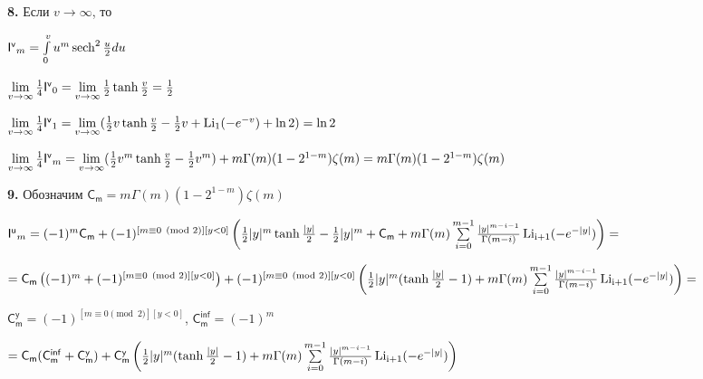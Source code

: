 \documentclass[a4paper,12pt]{article}
\begin{document}
\noindent\textbf{8.} Если $v \longrightarrow \infty$, то

\begin{center}
    $\mathsf{I^{v}}_m = \int\limits_0^{v} u^m \operatorname{sech}^2{u\over{2}} d u$
\end{center}

\begin{center}
    $\lim\limits_{v \rightarrow \infty} {1\over{4}}\mathsf{I^{v}}_0 = \lim\limits_{v \rightarrow \infty} {1\over{2}} \operatorname{tanh}{v\over{2}} = {1\over{2}}$
\end{center}

\begin{center}
    $\lim\limits_{v \rightarrow \infty} {1\over{4}} \mathsf{I^{v}}_1 = \lim\limits_{v \rightarrow \infty} ({1\over{2}} v\operatorname{tanh}{v\over{2}} - {1\over{2}}v + \operatorname{Li_1}(-e^{-v}) + \ln{2}) = \ln{2}$
\end{center}

\begin{center}
    $\lim\limits_{v \rightarrow \infty} {1\over{4}} \mathsf{I^{v}}_m = \lim\limits_{v \rightarrow \infty} ({1\over{2}} v^m \operatorname{tanh}{v\over{2}} - {1\over{2}}v^m) + m \Gamma(m)(1 - 2^{1 - m})\zeta(m) = m \Gamma(m)(1 - 2^{1 - m})\zeta(m)$
\end{center}

\noindent\textbf{9.} Обозначим $\mathsf{C_m} = m \Gamma(m)(1 - 2^{1 - m})\zeta(m)$

\begin{center}
    $\mathsf{I^u}_m = (-1)^m \mathsf{C_m} + (-1)^{[m \equiv 0 \pmod{2}][y < 0]} \left({1\over{2}}|y|^m \operatorname{tanh}{|y|\over{2}} - {1\over{2}}|y|^m + \mathsf{C_m} + m\Gamma(m)\sum\limits_{i = 0}^{m - 1} {|y|^{m - i - 1}\over{\Gamma(m - i)}} \operatorname{Li_{i + 1}}(-e^{-|y|})\right) =$
\end{center}

\begin{center}
    $= \mathsf{C_m} \left((-1)^m + (-1)^{[m \equiv 0 \pmod{2}][y < 0]}\right)  + (-1)^{[m \equiv 0 \pmod{2}][y < 0]} \left({1\over{2}}|y|^m (\operatorname{tanh}{|y|\over{2}} - 1) + m \Gamma(m)\sum\limits_{i = 0}^{m - 1} {|y|^{m - i - 1}\over{\Gamma(m - i)}} \operatorname{Li_{i + 1}}(-e^{-|y|})\right) =$
\end{center}

 $\mathsf{C_m^{y}} = (-1)^{[m \equiv 0 \pmod{2}][y < 0]}$, $\mathsf{C_m^{inf}} = (-1)^m$

\begin{center}
    $= \mathsf{C_m} (\mathsf{C_m^{inf}}+ \mathsf{C_m^{y}})  + \mathsf{C_m^{y}} \left({1\over{2}}|y|^m (\operatorname{tanh}{|y|\over{2}} - 1) + m \Gamma(m)\sum\limits_{i = 0}^{m - 1} {|y|^{m - i - 1}\over{\Gamma(m - i)}} \operatorname{Li_{i + 1}}(-e^{-|y|})\right)$
\end{center}
\end{document}
